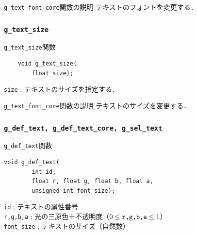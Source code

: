 \documentclass[platex,a4paper,12pt]{jsarticle}%
\begin{document}
\begin{itembox}[l]{\texttt{g\_text\_font\_core}関数の説明}
テキストのフォントを変更する．
\end{itembox}

\subsubsection{\texttt{g\_text\_size}}

\begin{itembox}[l]{\texttt{g\_text\_size}関数}
	\begin{verbatim}
	void g_text_size(
        float size);
	\end{verbatim}
	\verb|size| ; テキストのサイズを指定する．\\
\end{itembox}

\begin{itembox}[l]{\texttt{g\_text\_font\_core}関数の説明}
	テキストのサイズを変更する．
\end{itembox}


\clearpage
\subsubsection{\texttt{g\_def\_text, g\_def\_text\_core, g\_sel\_text}}

\begin{itembox}[l]{\texttt{g\_def\_text}関数}
\begin{verbatim}
void g_def_text(
        int id,
        float r, float g, float b, float a,
        unsigned int font_size);
\end{verbatim}
\verb|id| ; テキストの属性番号\\
\verb|r,g,b,a| ; 光の三原色＋不透明度（$0\leq \verb|r,g,b,a| \leq 1$）\\
\verb|font_size| ; テキストのサイズ（自然数）
\end{itembox}
\end{document}
